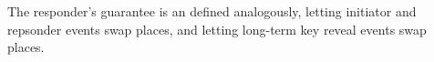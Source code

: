 %
The responder's guarantee is an defined analogously, letting initiator and
repsonder events swap places, and letting long-term key reveal events swap
places.
%




